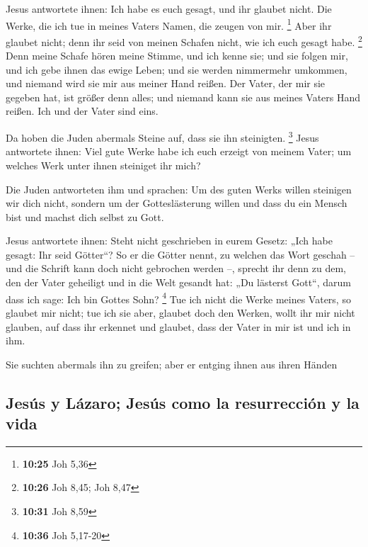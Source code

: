  Jesus antwortete ihnen: Ich habe es euch gesagt, und ihr
glaubet nicht. Die Werke, die ich tue in meines Vaters Namen, die zeugen
von mir. \footnote{\textbf{10:25} Joh 5,36}  Aber ihr
glaubet nicht; denn ihr seid von meinen Schafen nicht, wie ich euch
gesagt habe. \footnote{\textbf{10:26} Joh 8,45; Joh 8,47}
 Denn meine Schafe hören meine Stimme, und ich kenne sie;
und sie folgen mir,  und ich gebe ihnen das ewige Leben;
und sie werden nimmermehr umkommen, und niemand wird sie mir aus meiner
Hand reißen.  Der Vater, der mir sie gegeben hat, ist
größer denn alles; und niemand kann sie aus meines Vaters Hand reißen.
 Ich und der Vater sind eins.

 Da hoben die Juden abermals Steine auf, dass sie ihn
steinigten. \footnote{\textbf{10:31} Joh 8,59}  Jesus
antwortete ihnen: Viel gute Werke habe ich euch erzeigt von meinem
Vater; um welches Werk unter ihnen steiniget ihr mich?

 Die Juden antworteten ihm und sprachen: Um des guten
Werks willen steinigen wir dich nicht, sondern um der Gotteslästerung
willen und dass du ein Mensch bist und machst dich selbst zu Gott.

 Jesus antwortete ihnen: Steht nicht geschrieben in eurem
Gesetz: „Ich habe gesagt: Ihr seid Götter``?  So er die
Götter nennt, zu welchen das Wort geschah -- und die Schrift kann doch
nicht gebrochen werden --,  sprecht ihr denn zu dem, den
der Vater geheiligt und in die Welt gesandt hat: „Du lästerst Gott``,
darum dass ich sage: Ich bin Gottes Sohn? \footnote{\textbf{10:36} Joh
  5,17-20}  Tue ich nicht die Werke meines Vaters, so
glaubet mir nicht;  tue ich sie aber, glaubet doch den
Werken, wollt ihr mir nicht glauben, auf dass ihr erkennet und glaubet,
dass der Vater in mir ist und ich in ihm.

 Sie suchten abermals ihn zu greifen; aber er entging
ihnen aus ihren Händen

\hypertarget{jesuxfas-y-luxe1zaro-jesuxfas-como-la-resurrecciuxf3n-y-la-vida}{%
\subsection{Jesús y Lázaro; Jesús como la resurrección y la
vida}\label{jesuxfas-y-luxe1zaro-jesuxfas-como-la-resurrecciuxf3n-y-la-vida}}

